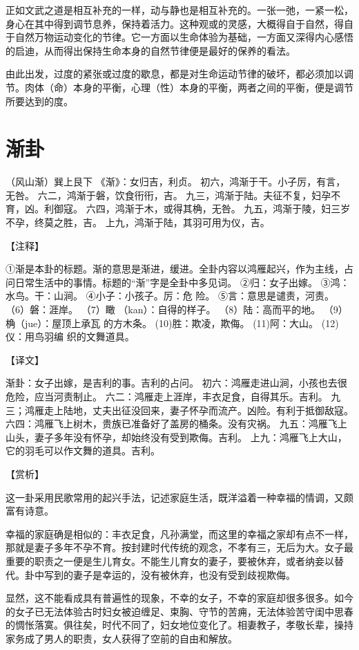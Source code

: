 \documentclass[a4paper,12pt,UTF8,twoside]{ctexbook}
\begin{document}
正如文武之道是相互补充的一样，动与静也是相互补充的。一张一弛，一紧一松，身心在其中得到调节息养，保持着活力。这种观或的灵感，大概得自于自然，得自于自然万物运动变化的节律。它一方面以生命体验为基础，一方面又深得内心感悟的启迪，从而得出保持生命本身的自然节律便是最好的保养的看法。

由此出发，过度的紧张或过度的歇息，都是对生命运动节律的破坏，都必须加以调节。肉体（命）本身的平衡，心理（性）本身的平衡，两者之间的平衡，便是调节所要达到的度。

\chapter{渐卦}

（风山渐）巽上艮下
《渐》：女归吉，利贞。
初六，鸿渐于干。小子厉，有言，无咎。
六二，鸿渐于磐，饮食衎衎，吉。
九三，鸿渐于陆。夫征不复，妇孕不育，凶。利御寇。
六四，鸿渐于木，或得其桷，无咎。
九五，鸿渐于陵，妇三岁不孕，终莫之胜，吉。
上九，鸿渐于陆，其羽可用为仪，吉。

【注释】

①渐是本卦的标题。渐的意思是渐进，缓进。全卦内容以鸿雁起兴，作为主线，占问日常生活中的事情。标题的“渐”字是全卦中多见词。
②归：女子出嫁。
③鸿：水鸟。干：山涧。
④小子：小孩子。厉：危 险。
⑤言：意思是谴责，河责。
（6）磐：涯岸。
（7）瞰 （kan）：自得的样子。
（8）陆：高而平的地。
（9）桷（jue）：屋顶上承瓦 的方木条。
(10)胜：欺凌，欺侮。
(11)阿：大山。
(12)仪：用鸟羽编 织的文舞道具。

【译文】

渐卦：女子出嫁，是吉利的事。吉利的占问。
初六：鸿雁走进山涧，小孩也去很危险，应当河责制止。
六二：鸿雁走上涯岸，丰衣足食，自得其乐。吉利。
九三；鸿雁走上陆地，丈夫出征没回来，妻子怀孕而流产。凶险。有利于抵御敌寇。
六四：鸿雁飞上树木，贵族已准备好了盖房的桶条。没有灾祸。
九五：鸿雁飞上山头，妻子多年没有怀孕，却始终没有受到欺侮。吉利。
上九：鸿雁飞上大山，它的羽毛可以作文舞的道具。吉利。

【赏析】

这一卦采用民歌常用的起兴手法，记述家庭生活，既洋溢着一种幸福的情调，又颇富有诗意。

幸福的家庭确是相似的：丰衣足食，凡孙满堂，而这里的幸福之家却有点不一样，那就是妻子多年不孕不育。按封建时代传统的观念，不孝有三，无后为大。女子最重要的职责之一便是生儿育女。不能生儿育女的妻子，要被休弃，或者纳妾以替代。卦中写到的妻子是幸运的，没有被休弃，也没有受到歧视欺侮。

显然，这不能看成具有普遍性的现象，不幸的女子，不幸的家庭却很多很多。如今的女子已无法体验古时妇女被迫缠足、束胸、守节的苦痈，无法体验苦守闺中思春的惆怅落寞。俱往矣，时代不同了，妇女地位变化了。相妻教子，孝敬长辈，操持家务成了男人的职责，女人获得了空前的自由和解放。
\end{document}
